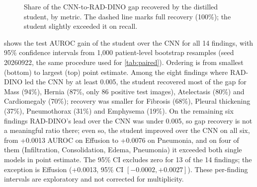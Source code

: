 \documentclass[conference]{IEEEtran}
\begin{document}
\begin{figure}[t]
\centering
{}
\caption{Share of the CNN-to-RAD-DINO gap recovered by the distilled student, by metric. The dashed line marks full recovery (100\%); the student slightly exceeded it on recall.}
\label{fig:gaprecovery}
\end{figure}

 shows the test AUROC gain of the student over the CNN for all 14 findings, with 95\% confidence intervals from 1,000 patient-level bootstrap resamples (seed 20260922, the same procedure used for \cref{tab:paired}). Ordering is from smallest (bottom) to largest (top) point estimate. Among the eight findings where RAD-DINO led the CNN by at least 0.005, the student recovered most of the gap for Mass (94\%), Hernia (87\%, only 86 positive test images), Atelectasis (80\%) and Cardiomegaly (70\%); recovery was smaller for Fibrosis (68\%), Pleural thickening (37\%), Pneumothorax (31\%) and Emphysema (19\%). On the remaining six findings RAD-DINO's lead over the CNN was under 0.005, so gap recovery is not a meaningful ratio there; even so, the student improved over the CNN on all six, from +0.0013 AUROC on Effusion to +0.0076 on Pneumonia, and on four of them (Infiltration, Consolidation, Edema, Pneumonia) it exceeded both single models in point estimate. The 95\% CI excludes zero for 13 of the 14 findings; the exception is Effusion (+0.0013, 95\% CI $[-0.0002,+0.0027]$). These per-finding intervals are exploratory and not corrected for multiplicity.
\end{document}
